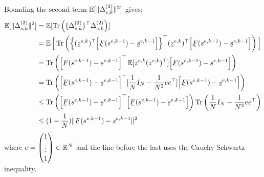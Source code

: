 Bounding the second term $\operatorname*{\mathbb{E}}[\lVert\Delta_{e,k}^{(2)}\rVert^2] $ gives:
\begin{equation}
\begin{split}
\E[\norm{\Delta_{e,k}^{(2)}}^2]  & = \E[\operatorname{Tr}\left(\{\Delta_{e,k}^{(2)}\}^\top\Delta_{e,k}^{(2)}\right)]  \\
& =  \E \Big[\operatorname{Tr}\left(\Big\{ (\barbelow{z}^{e,k})^\top \Big[ \barbelow{F}(s^{e,k-1}) - \barbelow{s}^{e,k-1} \Big] \Big\}^\top (\barbelow{z}^{e,k})^\top \Big[ \barbelow{F}(s^{e,k-1}) - \barbelow{s}^{e,k-1} \Big] \right) \Big] \\
& = \operatorname{Tr}\left(\Big[ \barbelow{F}(s^{e,k-1}) - \barbelow{s}^{e,k-1} \Big]^\top \E[\barbelow{z}^{e,k} (\barbelow{z}^{e,k})^\top ]  \Big[ \barbelow{F}(s^{e,k-1}) - \barbelow{s}^{e,k-1} \Big]\right) \\
& = \operatorname{Tr}\left(\Big[ \barbelow{F}(s^{e,k-1}) - \barbelow{s}^{e,k-1} \Big]^\top [\frac{1}{N} I_{N} - \frac{1}{N^2} ee^\top]  \Big[ \barbelow{F}(s^{e,k-1}) - \barbelow{s}^{e,k-1} \Big]\right) \\
& \leq\operatorname{Tr}\left(\Big[ \barbelow{F}(s^{e,k-1}) - \barbelow{s}^{e,k-1} \Big]^\top\Big[ \barbelow{F}(s^{e,k-1}) - \barbelow{s}^{e,k-1} \Big]\right) \operatorname{Tr} \left( \frac{1}{N} I_{N} - \frac{1}{N^2} ee^\top  \right) \\
& \leq  (1 -  \frac{1}{N}  )\norm{ \barbelow{F}(s^{e,k-1}) - \barbelow{s}^{e,k-1}}^2 \\
\end{split}
\end{equation}
where $e = \begin{pmatrix} 
1  \\
\vdots  \\
1
\end{pmatrix} \in \mathbb{R}^{N}$ and the line before the last uses the Cauchy Schwartz inequality.


